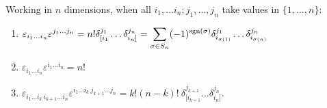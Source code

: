 \begin{proposition}
Working in $n$ dimensions, when all $i_1,\ldots i_n;j_1,\ldots, j_n$ take values in $\{ 1,\ldots, n \}$:
\begin{enumerate}
\item $\displaystyle \varepsilon_{i_1\ldots i_n}\varepsilon^{j_1\ldots j_n} = n!\delta^{j_1}_{[i_1}\ldots \delta^{j_n}_{i_n]} = \sum_{\sigma\in S_n} (-1)^{{\operatorname{sgn}}(\sigma)} \delta^{j_1}_{i_{\sigma(1)}} \dots \delta^{j_n}_{i_{\sigma(n)}}$
\item $\displaystyle \varepsilon _{i_{1}\dots i_{n}}\varepsilon ^{i_{1}\dots i_{n}}=n!$
\item $\displaystyle \varepsilon _{i_{1}\dots i_{k}~i_{k+1}\dots i_{n}}\varepsilon ^{i_{1}\dots i_{k}~j_{k+1}\dots j_{n}}=k!(n-k)!~\delta _{[i_{k+1}}^{j_{k+1}}\dots \delta _{i_{n}]}^{j_{n}}$.
\end{enumerate}
\end{proposition}
